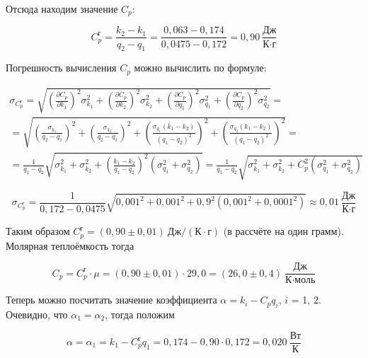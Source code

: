 \documentclass[a4paper,12pt]{article}
\begin{document}
Отсюда находим значение $C_p$:

\begin{equation}
    C_p^\text{г} = \frac{k_2 - k_1}{q_2 - q_1} = \frac{0,063 - 0,174}{0,0475 - 0,172} = 0,90 \ \frac{\text{Дж}}{\text{К} \cdot \text{г}}
\end{equation}

Погрешность вычисления $C_p$ можно вычислить по формуле:

\begin{multline*}
    \sigma_{C_p^\text{г}} = \sqrt{
    \left( \frac{\partial C_p}{\partial k_1} \right)^2 \sigma_{k_1}^2 + 
    \left( \frac{\partial C_p}{\partial k_2} \right)^2 \sigma_{k_2}^2 + 
    \left( \frac{\partial C_p}{\partial q_1} \right)^2 \sigma_{q_1}^2 + 
    \left( \frac{\partial C_p}{\partial q_2} \right)^2 \sigma_{q_2}^2
    } = \\
    = \sqrt{
    \left( \frac{\sigma_{k_1}}{q_2 - q_1} \right)^2 + \left( \frac{\sigma_{k_2}}{q_2 - q_1} \right)^2 + 
    \left( \frac{\sigma_{q_1} (k_1 - k_2)}{(q_1 - q_2)^2} \right)^2 + 
    \left( \frac{\sigma_{q_2} (k_1 - k_2)}{(q_1 - q_2)^2} \right)^2
    } = \\
    = \frac{1}{q_1 - q_2} \sqrt{
    \sigma_{k_1}^2 + \sigma_{k_2}^2 + \left( \frac{k_1 - k_2}{q_1 - q_2} \right)^2 \left( \sigma_{q_1}^2 + \sigma_{q_2}^2 \right)
    } = \frac{1}{q_1 - q_2} \sqrt{
    \sigma_{k_1}^2 + \sigma_{k_2}^2 + C_p^2 \left( \sigma_{q_1}^2 + \sigma_{q_2}^2 \right)
    }
\end{multline*}

\begin{equation}
    \sigma_{C_p^\text{г}} = \frac{1}{0,172 - 0,0475} \sqrt{
    0,001^2 + 0,001^2 + 0,9^2 \left( 0,001^2 + 0,0001^2 \right)
    } \approx 0,01 \ \frac{\text{Дж}}{\text{К} \cdot \text{г}}
\end{equation}

Таким образом $C_p^\text{г} = (0,90 \pm 0,01) \ \text{Дж}/(\text{К} \cdot \text{г})$ (в рассчёте на один грамм). Молярная теплоёмкость тогда

\begin{equation}
    C_p = C_p^\text{г} \cdot \mu = (0,90 \pm 0,01) \cdot 29,0 = (26,0 \pm 0,4) \ \frac{\text{Дж}}{\text{К} \cdot \text{моль}}
\end{equation}

Теперь можно посчитать значение коэффициента $\alpha = k_i - C_p q_i$, $i$ = 1, 2. Очевидно, что $\alpha_1 = \alpha_2$, тогда положим 

\begin{equation}
    \alpha = \alpha_1 = k_1 - C_p^\text{г} q_1 = 0,174 - 0,90 \cdot 0,172 = 0,020 \ \frac{\text{Вт}}{\text{К}}
\end{equation}
\end{document}
